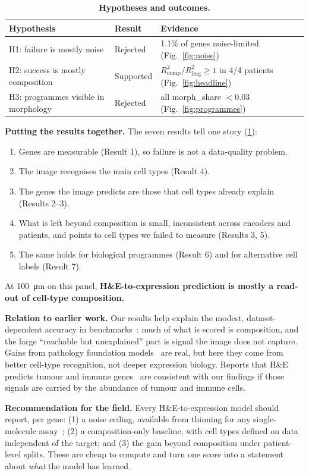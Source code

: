 \documentclass[11pt,a4paper]{article}
\newcommand{\Rc}{R^2_{\mathrm{comp}}}
\newcommand{\Ri}{R^2_{\mathrm{img}}}
\begin{document}
\begin{table}[h]
\centering
\caption{\textbf{Hypotheses and outcomes.}}
\label{tab:hyp}
\begin{tabular}{lll}
\toprule
Hypothesis & Result & Evidence \\
\midrule
H1: failure is mostly noise & Rejected & 1.1\% of genes noise-limited (Fig.~\ref{fig:noise}) \\
H2: success is mostly composition & Supported & $\Rc/\Ri\ge1$ in 4/4 patients (Fig.~\ref{fig:headline}) \\
H3: programmes visible in morphology & Rejected & all morph\_share $<0.03$ (Fig.~\ref{fig:programmes}) \\
\bottomrule
\end{tabular}
\end{table}

\textbf{Putting the results together.} The seven results tell one story (\cref{tab:hyp}):
\begin{enumerate}[leftmargin=*]
  \item Genes are measurable (Result 1), so failure is not a data-quality problem.
  \item The image recognises the main cell types (Result 4).
  \item The genes the image predicts are those that cell types already explain (Results 2--3).
  \item What is left beyond composition is small, inconsistent across encoders and patients, and points to cell types we failed to measure (Results 3, 5).
  \item The same holds for biological programmes (Result 6) and for alternative cell labels (Result 7).
\end{enumerate}
At \SI{100}{\micro\metre} on this panel, \textbf{H\&E-to-expression prediction is mostly a read-out of cell-type composition.}

\textbf{Relation to earlier work.} Our results help explain the modest, dataset-dependent accuracy in benchmarks~\cite{wang2025benchmark}: much of what is scored is composition, and the large ``reachable but unexplained'' part is signal the image does not capture. Gains from pathology foundation models~\cite{jaume2024hest} are real, but here they come from better cell-type recognition, not deeper expression biology. Reports that H\&E predicts tumour and immune genes~\cite{he2020stnet} are consistent with our findings if those signals are carried by the abundance of tumour and immune cells.

\textbf{Recommendation for the field.} Every H\&E-to-expression model should report, per gene: (1) a noise ceiling, available from thinning for any single-molecule assay~\cite{neufeld2024thinning}; (2) a composition-only baseline, with cell types defined on data independent of the target; and (3) the gain beyond composition under patient-level splits. These are cheap to compute and turn one score into a statement about \emph{what} the model has learned.
\end{document}
